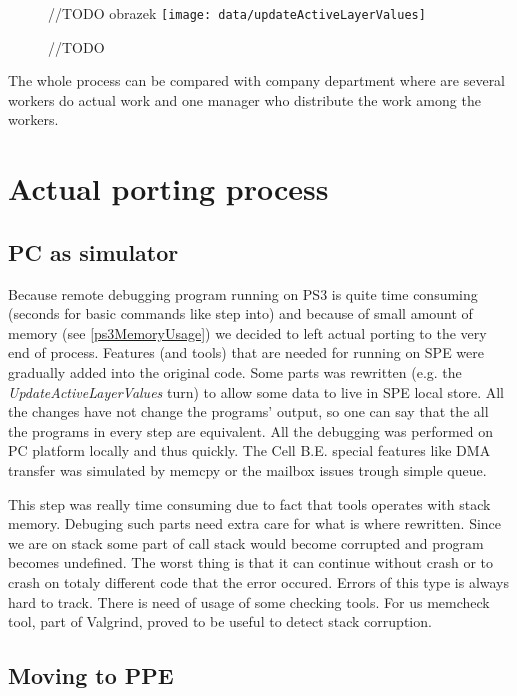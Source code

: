 \begin{figure}	//TODO obrazek
    \centering
    \texttt{[image: data/updateActiveLayerValues]}
    \caption[Diagram of new design components]{//TODO}
    \label{fg:updateActiveLayerValues}
\end{figure}

The whole process can be compared with company department where are several workers do actual work and one manager who distribute the work among the workers.

\section{Actual porting process}

\subsection{PC as simulator}
Because remote debugging program running on PS3 is quite time consuming (seconds for basic commands like step into) and because of small amount of memory (see \ref{ps3MemoryUsage}) we decided to left actual porting to the very end of process.
Features (and tools) that are needed for running on SPE were gradually added into the original code.
Some parts was rewritten (e.g. the \emph{UpdateActiveLayerValues} turn) to allow some data to live in SPE local store.
All the changes have not change the programs' output, so one can say that the all the programs in every step are equivalent.
All the debugging was performed on PC platform locally and thus quickly.
The Cell B.E. special features like DMA transfer was simulated by memcpy or the mailbox issues trough simple queue.

\par
This step was really time consuming due to fact that tools operates with stack memory.
Debuging such parts need extra care for what is where rewritten.
Since we are on stack some part of call stack would become corrupted and program becomes undefined.
The worst thing is that it can continue without crash or to crash on totaly different code that the error occured.
Errors of this type is always hard to track.
There is need of usage of some checking tools.
For us memcheck tool, part of Valgrind, proved to be useful to detect stack corruption.

\subsection{Moving to PPE}

